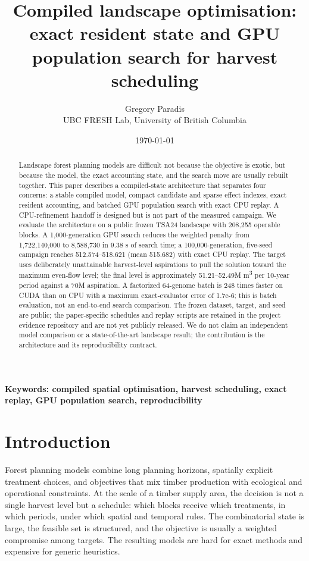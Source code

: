 \documentclass[11pt]{article}
\title{Compiled landscape optimisation: exact resident state and GPU population search for harvest scheduling}
\author{Gregory Paradis\\UBC FRESH Lab, University of British Columbia}
\date{\today}
\begin{document}
\maketitle

\begin{abstract}
Landscape forest planning models are difficult not because the objective is exotic, but
because the model, the exact accounting state, and the search move are usually rebuilt together. This
paper describes a compiled-state architecture that separates four concerns: a stable compiled model,
compact candidate and sparse effect indexes, exact resident accounting, and batched GPU population
search with exact CPU replay. A CPU-refinement handoff is designed but is not part of the measured
campaign. We evaluate the architecture on a public frozen TSA24
landscape with 208,255 operable blocks. A 1,000-generation GPU search reduces the weighted penalty
from 1,722,140,000 to 8,588,730 in 9.38 s of search time; a 100,000-generation,
five-seed campaign reaches 512.574–518.621 (mean 515.682) with exact CPU replay. The target uses
deliberately unattainable harvest-level aspirations to pull the solution toward the maximum even-flow
level; the final level is approximately 51.21–52.49M m\textsuperscript{3} per 10-year period against a 70M aspiration.
A factorized 64-genome batch is 248 times faster on CUDA than on CPU with a maximum exact-evaluator
error of 1.7e-6; this is batch evaluation, not an end-to-end search comparison.
The frozen dataset, target, and seed are public; the paper-specific schedules and replay scripts are retained in the project evidence repository and are not yet publicly released. We do not claim an independent model
comparison or a state-of-the-art landscape result; the contribution is the architecture and its
reproducibility contract.
\end{abstract}

\noindent\textbf{Keywords: compiled spatial optimisation, harvest scheduling, exact replay, GPU population search, reproducibility}

\section{Introduction}\label{introduction}

Forest planning models combine long planning horizons, spatially explicit treatment choices, and objectives that mix timber production with ecological and operational constraints. At the scale of a timber supply area, the decision is not a single harvest level but a schedule: which blocks receive which treatments, in which periods, under which spatial and temporal rules. The combinatorial state is large, the feasible set is structured, and the objective is usually a weighted compromise among targets. The resulting models are hard for exact methods and expensive for generic heuristics.
\end{document}
